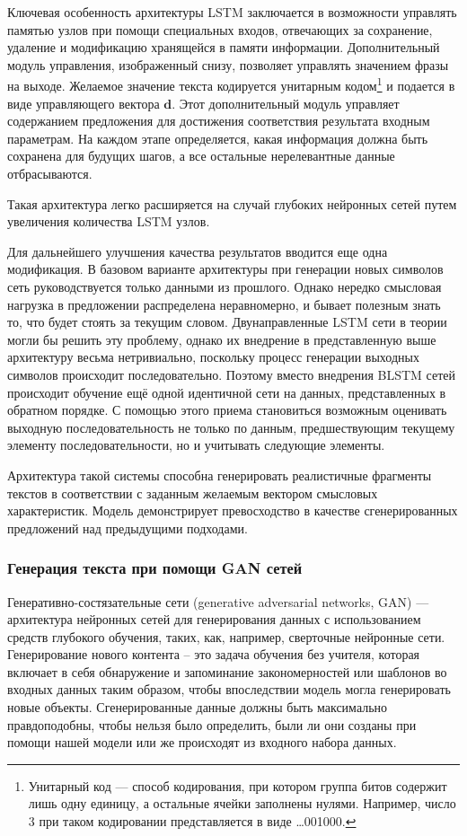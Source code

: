 Ключевая особенность архитектуры LSTM заключается в возможности управлять памятью узлов при помощи специальных входов, отвечающих за сохранение, удаление и модификацию хранящейся в памяти информации. Дополнительный модуль управления, изображенный снизу, позволяет управлять значением фразы на выходе. Желаемое значение текста кодируется унитарным кодом\footnote{Унитарный код --- способ кодирования, при котором группа битов содержит лишь одну единицу, а остальные ячейки заполнены нулями. Например, число 3 при таком кодировании представляется в виде \ldots001000.} и подается в виде управляющего вектора $\mathbf{d}$. Этот дополнительный модуль управляет содержанием предложения для достижения соответствия результата входным параметрам. На каждом этапе определяется, какая информация должна быть сохранена для будущих шагов, а все остальные нерелевантные данные отбрасываются.

Такая архитектура легко расширяется на случай глубоких нейронных сетей путем увеличения количества LSTM узлов.

Для дальнейшего улучшения качества результатов вводится еще одна модификация. В базовом варианте архитектуры при генерации новых символов сеть руководствуется только данными из прошлого. Однако нередко смысловая нагрузка в предложении распределена неравномерно, и бывает полезным знать то, что будет стоять за текущим словом. Двунаправленные LSTM сети\cite{graves2013hybrid} в теории могли бы решить эту проблему, однако их внедрение в представленную выше архитектуру весьма нетривиально, поскольку процесс генерации выходных символов происходит последовательно. Поэтому вместо внедрения BLSTM сетей происходит обучение ещё одной идентичной сети на данных, представленных в обратном порядке. С помощью этого приема становиться возможным оценивать выходную последовательность не только по данным, предшествующим текущему элементу последовательности, но и учитывать следующие элементы.

Архитектура такой системы способна генерировать реалистичные фрагменты текстов в соответствии с заданным желаемым вектором смысловых характеристик. Модель демонстрирует превосходство в качестве сгенерированных предложений над предыдущими подходами\cite{wen2015semantically}.

\subsubsection{Генерация текста при помощи GAN сетей}
Генеративно-состязательные сети (generative adversarial networks, GAN) --- архитектура нейронных сетей для генерирования данных с использованием средств глубокого обучения, таких, как, например, сверточные нейронные сети. Генерирование нового контента -- это задача обучения без учителя, которая включает в себя обнаружение и запоминание закономерностей или шаблонов во входных данных таким образом, чтобы впоследствии модель могла генерировать новые объекты. Сгенерированные данные должны быть максимально правдоподобны, чтобы нельзя было определить, были ли они созданы при помощи нашей модели или же происходят из входного набора данных.

